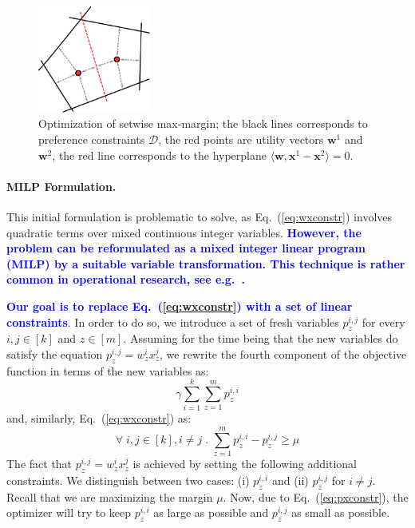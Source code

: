 \documentclass{article}
\renewcommand\[{\begin{equation}}
\renewcommand\]{\end{equation}}
\newcommand{\calvar}[1]{\ensuremath{\mathcal{#1}}}
\newcommand{\calD}{\calvar{D}}
\newcommand{\vecvar}[1]{\ensuremath{\boldsymbol{#1}}}
\newcommand{\vw}{\vecvar{w}}
\newcommand{\vx}{\vecvar{x}}
\newcommand{\andrea}[1]{{\bf \textcolor{blue}{{\fbox{Andrea:} #1}}}}
\begin{document}
\begin{figure}[t]
    \begin{center}
        \includegraphics[width=10em]{figures/setmargin}
    \end{center}
    \caption{\label{fig:setmargin} Optimization of setwise max-margin; the black lines corresponds to preference constraints $\calD$, the red points are utility vectors $\vw^{1}$ and $\vw^{2}$, the red line corresponds to the hyperplane $\langle \vw, \vx^{1} - \vx^{2} \rangle = 0$.}
\end{figure}

\paragraph{MILP Formulation.} This initial formulation is problematic
to solve, as Eq.~(\ref{eq:wxconstr}) involves quadratic terms over
mixed continuous integer variables.  \andrea{However, the problem can
  be reformulated as a mixed integer linear program (MILP) by a
  suitable variable transformation. This technique is rather common in
  operational research, see e.g.~\cite{boutilier2006}.}

\andrea{Our goal is to replace Eq.~(\ref{eq:wxconstr}) with a set of linear
constraints}. In order to do so, we introduce a set of fresh variables
$p^{i,j}_z$ for every $i,j\in[k]$ and $z\in[m]$. Assuming for the time
being that the new variables do satisfy the equation
$p^{i,j}_z = w^i_z x^j_z$, we rewrite the fourth component of the
objective function in terms of the new variables as:
%
$$ \gamma \sum_{i=1}^k \sum_{z=1}^m p^{i,i}_z$$
%
and, similarly, Eq.~(\ref{eq:wxconstr}) as:
%
\[ \forall \; i, j \in [k], i \neq j \;.\; \sum_{z=1}^m p^{i,i}_z - p^{i,j}_z \ge \mu \label{eq:pxconstr} \]
%
The fact that $p^{i,j}_z = w^{i}_z x^{j}_z$ is achieved by
setting the following additional constraints. We distinguish between two cases:
(i) $p^{i,i}_z$ and (ii) $p^{i,j}_z$ for $i \ne j$.  Recall that we are
maximizing the margin $\mu$. Now, due to Eq.~(\ref{eq:pxconstr}), the optimizer will
try to keep $p^{i,i}_z$ as large as possible and $p^{i,j}_z$ as small as
possible.
\end{document}

